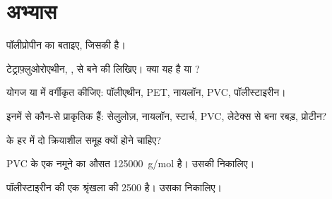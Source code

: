 \section{अभ्यास}

\begin{exercise}[$\star$]\label{exo:g12:polymers:1}
पॉलीप्रोपीन का  बताइए, जिसकी 
 है।
\end{exercise}

\begin{exercise}[$\star$]\label{exo:g12:polymers:2}
टेट्राफ़्लुओरोएथीन, , से बने  की  लिखिए।
क्या यह  है या ?
\end{exercise}

\begin{exercise}[$\star$]\label{exo:g12:polymers:3}
योगज या  में वर्गीकृत कीजिए: पॉलीएथीन, PET, नायलॉन,
PVC, पॉलीस्टाइरीन।
\end{exercise}

\begin{exercise}[$\star$]\label{exo:g12:polymers:4}
इनमें से कौन-से  प्राकृतिक हैं: सेलुलोज़, नायलॉन, स्टार्च, PVC,
लेटेक्स से बना रबड़, प्रोटीन?
\end{exercise}

\begin{exercise}[$\star$]\label{exo:g12:polymers:5}
 के हर  में दो क्रियाशील समूह क्यों होने
चाहिए?
\end{exercise}

\begin{exercise}[$\star\star$]\label{exo:g12:polymers:6}
PVC के एक नमूने का औसत  \qty{125000}{g/mol} है।
उसकी  निकालिए।
\end{exercise}

\begin{exercise}[$\star\star$]\label{exo:g12:polymers:7}
पॉलीस्टाइरीन की एक श्रृंखला की  2500 है। उसका
 निकालिए।
\end{exercise}


